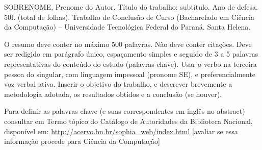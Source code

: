 SOBRENOME, Prenome do Autor. Título do trabalho: subtítulo. Ano de defesa. 50f. (total de folhas). Trabalho de Conclusão de Curso (Bacharelado em Ciência da Computação) – Universidade Tecnológica Federal do Paraná. Santa Helena. 

O resumo deve conter no máximo 500 palavras. Não deve conter citações. Deve ser redigido em parágrafo único, espaçamento simples e seguido de 3 a 5 palavras representativas do conteúdo do estudo (palavras-chave). Usar o verbo na terceira pessoa do singular, com linguagem impessoal (pronome SE), e preferencialmente voz verbal ativa. Inserir o objetivo do trabalho, e descrever brevemente a metodologia adotada, os resultados obtidos e a conclusão (se houver).

Para definir as palavras-chave (e suas correspondentes em inglês no abstract) consultar em Termo tópico do Catálogo de Autoridades da Biblioteca Nacional, disponível em: \url{http://acervo.bn.br/sophia_web/index.html} [avaliar se essa informação procede para Ciência da Computação]
